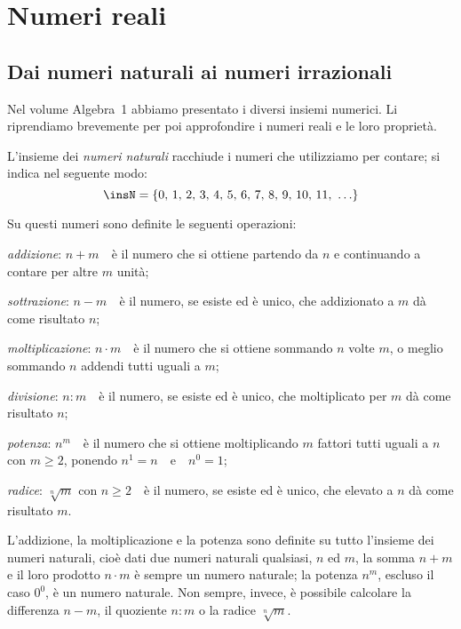 \chapter{Numeri reali}
\section{Dai numeri naturali ai numeri irrazionali}
Nel volume Algebra~1 abbiamo presentato i diversi insiemi numerici. Li riprendiamo brevemente per poi approfondire i numeri reali e le loro proprietà.

L'insieme dei \emph{numeri naturali} racchiude i numeri che utilizziamo per contare; si indica nel seguente modo:
\[\insN=\{0\text{, }1\text{, }2\text{, }3\text{, }4\text{, }5\text{, }6\text{, }7\text{, }8\text{, }9\text{, }10\text{, }11\text{, }\ldots\}\]

Su questi numeri sono definite le seguenti operazioni:
\begin{itemize*}
 \item \emph{addizione}: $n+m$~~è il numero che si ottiene partendo da $n$ e continuando a contare per altre $m$ unità;
 \item \emph{sottrazione}: $n-m$~~è il numero, se esiste ed è unico, che addizionato a $m$ dà come risultato $n$;
 \item \emph{moltiplicazione}: $n \cdot m$~~è il numero che si ottiene sommando $n$ volte $m$, o meglio sommando $n$ addendi tutti uguali a $m$;
 \item \emph{divisione}: $n:m$~~è il numero, se esiste ed è unico, che moltiplicato per $m$ dà come risultato $n$;
 \item \emph{potenza}: $n^{m}$~~è il numero che si ottiene moltiplicando $m$ fattori tutti uguali a $n$ con $m \ge 2$, ponendo $n^{1}=n$~~e~~$n^{0}=1$;
 \item \emph{radice}: $\sqrt[n]{m}$ con $n\ge 2$~~è il numero, se esiste ed è unico, che elevato a $n$ dà come risultato $m$.
\end{itemize*}

L'addizione, la moltiplicazione e la potenza sono definite su tutto l'insieme dei numeri naturali, cioè dati due numeri naturali qualsiasi, $n$ ed $m$, la somma $n+m$ e il loro prodotto $n \cdot m$ è sempre un numero naturale; la potenza $n^{m}$, escluso il caso $0^{0}$, è un numero naturale. Non sempre, invece, è possibile calcolare la differenza $n-m$, il quoziente $n:m$ o la radice $\sqrt[n]{m}$.

